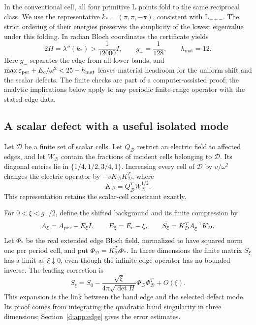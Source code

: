 In the conventional cell, all four primitive \(\mathrm{L}\) points fold to the
same reciprocal class. We use the representative \(k_*=(\pi,\pi,-\pi)\),
consistent with \(\mathrm{L}_{++-}\). The strict ordering of their energies preserves the
simplicity of the lowest eigenvalue under this folding. In radian Bloch
coordinates the certificate yields
\begin{equation}
 2H=\lambda''(k_*)>\frac1{12000}I,
 \qquad g_-=\frac1{128},
 \qquad h_{\mathrm{mat}}=12.
 \label{d:eq:physical-certified-constants}
\end{equation}
Here \(g_-\) separates the edge from all lower bands, and
\(\max\varepsilon_{\mathrm{per}}+E_c/\omega^2<25-h_{\mathrm{mat}}\) leaves material
headroom for the uniform shift and the scalar defects. The finite checks
are part of a computer-assisted proof; the analytic implications below
apply to any periodic finite-range operator with the stated edge data.

\subsection{A scalar defect with a useful isolated mode}

Let \(\mathcal D\) be a finite set of scalar cells. Let \(Q_{\mathcal D}\)
restrict an electric field to affected edges, and let \(W_{\mathcal D}\) contain the
fractions of incident cells belonging to \(\mathcal D\). Its diagonal
entries lie in \(\{1/4,1/2,3/4,1\}\). Increasing every cell of
\(\mathcal D\) by \(v/\omega^2\) changes the electric operator by
\(-vK_{\mathcal D}K_{\mathcal D}^T\), where
\[
 K_{\mathcal D}=Q_{\mathcal D}^TW_{\mathcal D}^{1/2}.
\]
This representation retains the scalar-cell constraint exactly.

For \(0<\xi<g_-/2\), define the shifted background and its finite
compression by
\begin{equation}
 A_\xi=A_{\rm per}-E_\xi I,\qquad E_\xi=E_c-\xi,
 \qquad
 S_\xi=K_{\mathcal D}^TA_\xi^{-1}K_{\mathcal D}.
 \label{d:eq:physical-compression}
\end{equation}
Let \(\Phi_*\) be the real extended edge Bloch field, normalized to have
squared norm one per period cell, and put
\(\Phi_{\mathcal D}=K_{\mathcal D}^T\Phi_*\). In three dimensions the finite matrix
\(S_\xi\) has a limit as \(\xi\downarrow0\), even though the infinite
edge operator has no bounded inverse. The leading correction is
\begin{equation}
 S_\xi=S_0-
   \frac{\sqrt{\xi}}{4\pi\sqrt{\det H}}\Phi_{\mathcal D}\Phi_{\mathcal D}^T+O(\xi).
 \label{d:eq:physical-square-root}
\end{equation}
This expansion is the link between the band edge and the selected defect
mode. Its proof comes from integrating the quadratic band singularity in
three dimensions; Section~\ref{d:app:edge} gives the error estimates.

